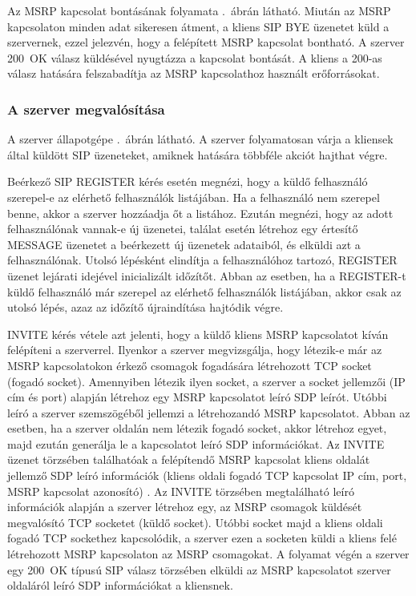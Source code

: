 Az MSRP kapcsolat bontásának folyamata .~ábrán látható. Miután az MSRP kapcsolaton minden adat sikeresen átment, a kliens SIP BYE üzenetet küld a szervernek, ezzel jelezvén, hogy a felépített MSRP kapcsolat bontható. A szerver 200~OK válasz küldésével nyugtázza a kapcsolat bontását. A kliens a 200-as válasz hatására felszabadítja az MSRP kapcsolathoz használt erőforrásokat.

\subsubsection{A szerver megvalósítása}
\label{sec:szervermegvalositas}

A szerver állapotgépe .~ábrán látható. A szerver folyamatosan várja a kliensek által küldött SIP üzeneteket, amiknek hatására többféle akciót hajthat végre.

Beérkező SIP REGISTER kérés esetén megnézi, hogy a küldő felhasználó szerepel-e az elérhető felhasználók listájában. Ha a felhasználó nem szerepel benne, akkor a szerver hozzáadja őt a listához. Ezután megnézi, hogy az adott felhasználónak vannak-e új üzenetei, találat esetén létrehoz egy értesítő MESSAGE üzenetet a beérkezett új üzenetek adataiból, és elküldi azt a felhasználónak. Utolsó lépésként elindítja a felhasználóhoz tartozó, REGISTER üzenet lejárati idejével inicializált időzítőt. Abban az esetben, ha a REGISTER-t küldő felhasználó már szerepel az elérhető felhasználók listájában, akkor csak az utolsó lépés, azaz az időzítő újraindítása hajtódik végre.

INVITE kérés vétele azt jelenti, hogy a küldő kliens MSRP kapcsolatot kíván felépíteni a szerverrel. Ilyenkor a szerver megvizsgálja, hogy létezik-e már az MSRP kapcsolatokon érkező csomagok fogadására létrehozott TCP socket (fogadó socket). Amennyiben létezik ilyen socket, a szerver a socket jellemzői (IP cím és port) alapján létrehoz egy MSRP kapcsolatot leíró SDP leírót. Utóbbi leíró a szerver szemszögéből jellemzi a létrehozandó MSRP kapcsolatot. Abban az esetben, ha a szerver oldalán nem létezik fogadó socket, akkor létrehoz egyet, majd ezután generálja le a kapcsolatot leíró SDP információkat.  Az INVITE üzenet törzsében találhatóak a felépítendő MSRP kapcsolat kliens oldalát jellemző SDP leíró információk (kliens oldali fogadó TCP kapcsolat IP cím, port, MSRP kapcsolat azonosító) . Az INVITE törzsében megtalálható leíró információk alapján a szerver létrehoz egy, az MSRP csomagok küldését megvalósító TCP socketet (küldő socket). Utóbbi socket majd a kliens oldali fogadó TCP sockethez kapcsolódik, a szerver ezen a socketen küldi a kliens felé létrehozott MSRP kapcsolaton az MSRP csomagokat. A folyamat végén a szerver egy 200~OK típusú SIP válasz törzsében elküldi az MSRP kapcsolatot szerver oldaláról leíró SDP információkat a kliensnek.

